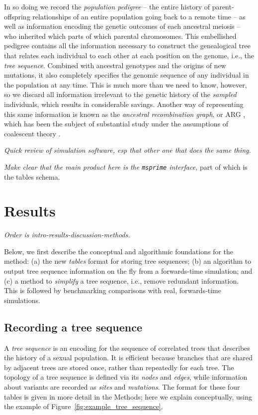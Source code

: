 \documentclass{article}
\newcommand{\msprime}{\texttt{msprime}}
\newcommand{\plr}[1]{{\em \color{blue} #1}}
\begin{document}
In so doing we record the \emph{population pedigree} --
the entire history of parent-offspring relationships of an entire population going back to a remote time --
as well as information encoding the genetic outcomes of each ancestral meiosis --
who inherited which parts of which parental chromosomes.
This embellished pedigree contains all the information necessary
to construct the genealogical tree that relates each individual to each other
at each position on the genome, i.e., the \emph{tree sequence}.
Combined with ancestral genotypes and the origins of new mutations,
it also completely specifies the genomic sequence of any individual in the population at any time.
This is much more than we need to know, however,
so we discard all information irrelevant to the genetic history
of the \emph{sampled} individuals,
which results in considerable savings.
Another way of representing this same information
is known as the \emph{ancestral recombination graph}, or {ARG} \citep{griffiths1997ancestral},
which has been the subject of substantial study
under the assumptions of coalescent theory \citep{wiuf1997number,wiuf1999ancestry,marjoram2006coalescent,wilton2015smc}.

\plr{Quick review of simulation software, esp that other one that does the same thing.}

\plr{Make clear that the main product here is the \msprime{} interface,}
part of which is the tables schema.


\section*{Results}

\plr{Order is intro-results-discussion-methods.}

Below, we first describe the conceptual and algorithmic foundations for the method:
(a) the new \emph{tables} format for storing tree sequences;
(b) an algorithm to output tree sequence information on the fly
    from a forwards-time simulation;
and (c) a method to \emph{simplify} a tree sequence, i.e., remove redundant information.
This is followed by benchmarking comparisons
with real, forwards-time simulations.


\subsection*{Recording a tree sequence}

A \emph{tree sequence} is an encoding for the sequence of correlated trees 
that describes the history of a sexual population.
It is efficient because branches that are shared by adjacent trees are stored once, 
rather than repeatedly for each tree.
The topology of a tree sequence is defined via its \emph{nodes} and \emph{edges},
while information about variants are recorded as \emph{sites} and \emph{mutations}.
The format for these four tables is given in more detail in the Methods;
here we explain conceptually,
using the example of Figure~\ref{fig:example_tree_sequence}.
\end{document}

